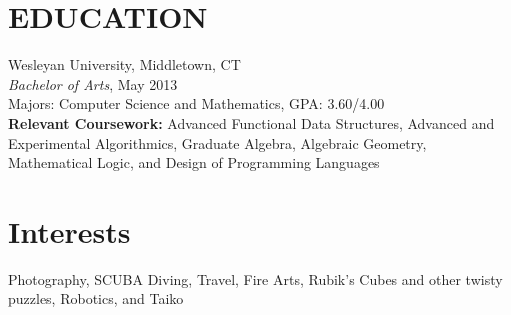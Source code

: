 \documentclass[11pt]{res} %
\begin{document}
\begin{resume}
\section{EDUCATION}
 \noindent Wesleyan University, Middletown, CT \\
{\it Bachelor of Arts}, May 2013 \\
Majors: Computer Science and Mathematics, GPA: 3.60/4.00 \\
{\bf Relevant Coursework:} Advanced Functional Data Structures, Advanced and
Experimental Algorithmics, Graduate Algebra, Algebraic Geometry, Mathematical
Logic, and Design of Programming Languages


\section{Interests}
Photography, SCUBA Diving, Travel, Fire Arts, Rubik's Cubes and other twisty
puzzles, Robotics, and Taiko

\end{resume}
\end{document}
